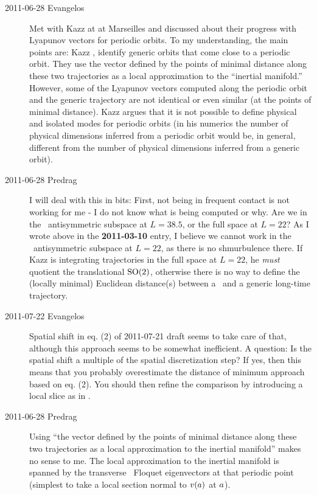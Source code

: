 \begin{description}
\item[2011-06-28 Evangelos]
Met with Kazz at 
at Marseilles and discussed about their progress with Lyapunov vectors
for periodic orbits. To my understanding, the main points are: Kazz
\etal, identify generic orbits that come close to a periodic orbit. They
use the vector defined by the points of minimal distance along these two
trajectories as a local approximation to the ``inertial manifold.''
However, some of the Lyapunov vectors computed along the periodic orbit
and the generic trajectory are not identical or even similar (at the
points of minimal distance). Kazz argues that it is not possible to
define physical and isolated modes for periodic orbits (in his numerics
the number of physical dimensions inferred from a periodic orbit would
be, in general, different from the number of physical dimensions inferred
from a generic orbit).

\item[2011-06-28 Predrag] I will deal with this in bits:
First, not being in frequent contact is not working for me - I
do not know what is being computed or why. Are we in the \KS\
antisymmetric subspace at $L = 38.5$, or the
full space at $L=22$? As I wrote above in the {\bf 2011-03-10}
entry, I believe we cannot work in the \KS\ antisymmetric
subspace at $L=22$, as there is no shmurbulence there. If Kazz
is integrating trajectories in the full space at $L=22$, he
\emph{must} quotient the translational $\textrm{SO}(2)$, otherwise
there is no way to define the (locally minimal) Euclidean
distance(s) between a \po\ and a generic long-time trajectory.

\item[2011-07-22 Evangelos] Spatial shift in eq. (2) of 2011-07-21 draft seems
to take care of that, although this approach seems to be somewhat inefficient.
A question: Is the spatial shift a multiple of the spatial discretization step?
If yes, then this means that you probably overestimate the distance of minimum
approach based on eq. (2). You should then refine the comparison by introducing
a local slice as in \refrefs{SiCvi10,FrCv11}.


\item[2011-06-28 Predrag]
Using ``the vector defined by the points of minimal distance along these two
trajectories as a local approximation to the inertial manifold'' makes no sense to me.
The local approximation to the inertial manifold is spanned by the transverse
\po\ Floquet eigenvectors at that periodic point (simplest to take a local \Poincare section
normal to $v(a)$ at $a$).


\end{description}
